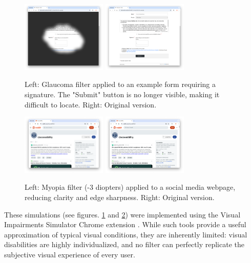\begin{figure}
    \centering
    \includegraphics[width=115pt]{imgs/glaucoma-filter.png}
    \includegraphics[width=115pt]{imgs/no-glaucoma-filter.png}
    \caption{Left: Glaucoma filter applied to an example form requiring a signature. The "Submit" button is no longer visible, making it difficult to locate. Right: Original version.}
    \label{fig:glaucoma-filters}
\end{figure}

\begin{figure}
    \centering
    \includegraphics[width=115pt]{imgs/myopia-filter.png}
    \includegraphics[width=115pt]{imgs/no-myopia-filter.png}
    \caption{Left: Myopia filter (-3 diopters) applied to a social media webpage, reducing clarity and edge sharpness. Right: Original version.}
    \label{fig:myopia-filters}
\end{figure}

These simulations (see figures. \ref{fig:glaucoma-filters} and \ref{fig:myopia-filters}) were implemented using the Visual Impairments Simulator Chrome extension \cite{visual_impairments_simulator}. While such tools provide a useful approximation of typical visual conditions, they are inherently limited: visual disabilities are highly individualized, and no filter can perfectly replicate the subjective visual experience of every user.

